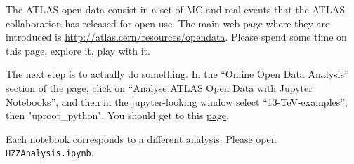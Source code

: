 
The ATLAS open data consist in a set of MC and real events that the ATLAS collaboration has released for open use. The main web page where they are introduced is \url{http://atlas.cern/resources/opendata}. Please spend some time on this page, explore it, play with it.

The next step is to actually do something. In the ``Online Open Data Analysis'' section of the page, click on ``Analyse ATLAS Open Data with Jupyter Notebooks'', and then in the jupyter-looking window select ``13-TeV-examples'', then "uproot\_python". You should get to this \href{https://notebooks.gesis.org/binder/jupyter/user/atlas-outreach--ection-opendata-hbw4boy5/notebooks/13-TeV-examples/uproot_python}{page}. 

Each notebook corresponds to a different analysis. Please open \verb|HZZAnalysis.ipynb|.